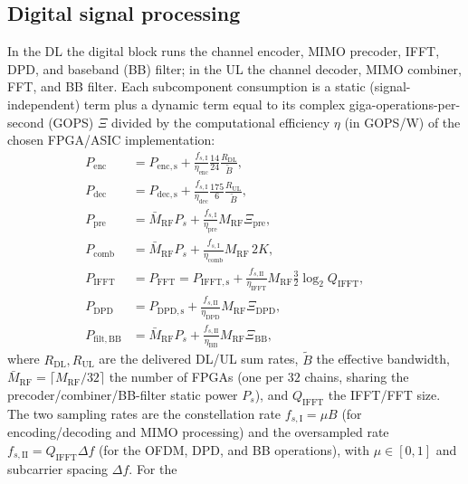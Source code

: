 \subsection{Digital signal processing}
\label{sec:dig}
In the DL the digital block runs the channel encoder, MIMO precoder, IFFT, DPD,
and baseband (BB) filter; in the UL the channel decoder, MIMO combiner, FFT,
and BB filter. Each subcomponent consumption is a static (signal-independent)
term plus a dynamic term equal to its complex giga-operations-per-second
(GOPS) $\Xi$ divided by the computational efficiency $\eta$ (in GOPS/W) of the
chosen FPGA/ASIC implementation: 
\begin{align}
\label{eq:enc}
P_{\mathrm{enc}} &= P_{\mathrm{enc,s}}
+ \frac{f_{s,\mathrm{I}}}{\eta_{\mathrm{enc}}}\frac{14}{24}\frac{R_{\mathrm{DL}}}{\tilde B}, \\
P_{\mathrm{dec}} &= P_{\mathrm{dec,s}}
+ \frac{f_{s,\mathrm{I}}}{\eta_{\mathrm{dec}}}\frac{175}{6}\frac{R_{\mathrm{UL}}}{\tilde B},\\
\label{eq:pre}
P_{\mathrm{pre}} &= \bar M_{\mathrm{RF}}P_{s}
+ \frac{f_{s,\mathrm{I}}}{\eta_{\mathrm{pre}}}M_{\mathrm{RF}}\Xi_{\mathrm{pre}},\\
 P_{\mathrm{comb}} &= \bar M_{\mathrm{RF}}P_{s}
+ \frac{f_{s,\mathrm{I}}}{\eta_{\mathrm{comb}}}M_{\mathrm{RF}}\,2K,\\
\label{eq:ifft}
P_{\mathrm{IFFT}} &= P_{\mathrm{FFT}} = P_{\mathrm{IFFT,s}}
+ \frac{f_{s,\mathrm{II}}}{\eta_{\mathrm{IFFT}}}M_{\mathrm{RF}}\tfrac{3}{2}\log_2 Q_{\mathrm{IFFT}}, & & \\
\label{eq:dpd}
P_{\mathrm{DPD}} &= P_{\mathrm{DPD,s}}
+ \frac{f_{s,\mathrm{II}}}{\eta_{\mathrm{DPD}}}M_{\mathrm{RF}}\Xi_{\mathrm{DPD}}, & & \\
\label{eq:bb}
P_{\mathrm{filt,BB}} &= \bar M_{\mathrm{RF}}P_{s}
+ \frac{f_{s,\mathrm{II}}}{\eta_{\mathrm{BB}}}M_{\mathrm{RF}}\Xi_{\mathrm{BB}}, & &
\end{align}
where $R_{\mathrm{DL}},R_{\mathrm{UL}}$ are the delivered DL/UL sum rates,
$\tilde B$ the effective bandwidth,
$\bar M_{\mathrm{RF}}=\lceil M_{\mathrm{RF}}/32\rceil$ the number of FPGAs (one
per $32$ chains, sharing the precoder/combiner/BB-filter static power $P_{s}$),
and $Q_{\mathrm{IFFT}}$ the IFFT/FFT size. The two sampling rates are the
constellation rate $f_{s,\mathrm{I}}=\mu B$ (for encoding/decoding and
MIMO processing) and the oversampled rate
$f_{s,\mathrm{II}}=Q_{\mathrm{IFFT}}\Delta f$ (for the OFDM, DPD, and BB
operations), with $\mu\in[0,1]$ and subcarrier spacing $\Delta f$. For the
